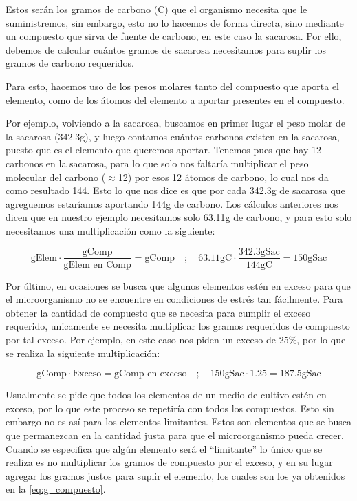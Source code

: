 Estos serán los gramos de carbono ($\text{C}$) que el organismo necesita que le suministremos, sin embargo, esto no lo hacemos de forma directa, sino mediante un compuesto que sirva de fuente de carbono, en este caso la sacarosa. Por ello, debemos de calcular cuántos gramos de sacarosa necesitamos para suplir los gramos de carbono requeridos.

Para esto, hacemos uso de los pesos molares tanto del compuesto que aporta el elemento, como de los átomos del elemento a aportar presentes en el compuesto.

Por ejemplo, volviendo a la sacarosa, buscamos en primer lugar el peso molar de la sacarosa (342.3g), y luego contamos cuántos carbonos existen en la sacarosa, puesto que es el elemento que queremos aportar. Tenemos pues que hay 12 carbonos en la sacarosa, para lo que solo nos faltaría multiplicar el peso molecular del carbono ($\approx$12) por esos 12 átomos de carbono, lo cual nos da como resultado 144. Esto lo que nos dice es que por cada 342.3g de sacarosa que agreguemos estaríamos aportando 144g de carbono. Los cálculos anteriores nos dicen que en nuestro ejemplo necesitamos solo 63.11g de carbono, y para esto solo necesitamos una multiplicación como la siguiente:  

\begin{equation}\label{eq:g_compuesto}
    \text{gElem} \cdot \frac{\text{gComp}}{\text{gElem en Comp}} = \text{gComp} \quad ; \quad 63.11\text{gC} \cdot \frac{342.3\text{gSac}}{144\text{gC}} = 150\text{gSac}
\end{equation}

Por último, en ocasiones se busca que algunos elementos estén en exceso para que el microorganismo no se encuentre en condiciones de estrés tan fácilmente. Para obtener la cantidad de compuesto que se necesita para cumplir el exceso requerido, unicamente se necesita multiplicar los gramos requeridos de compuesto por tal exceso. Por ejemplo, en este caso nos piden un exceso de 25\%, por lo que se realiza la siguiente multiplicación: 

\begin{equation}\label{eq:g_exceso}
    \text{gComp} \cdot \text{Exceso} = \text{gComp en exceso} \quad ; \quad 150\text{gSac} \cdot 1.25 = 187.5\text{gSac}
\end{equation}

Usualmente se pide que todos los elementos de un medio de cultivo estén en exceso, por lo que este proceso se repetiría con todos los compuestos. Esto sin embargo no es así para los elementos limitantes. Estos son elementos que se busca que permanezcan en la cantidad justa para que el microorganismo pueda crecer. Cuando se especifica que algún elemento será el ``limitante'' lo único que se realiza es no multiplicar los gramos de compuesto por el exceso, y en su lugar agregar los gramos justos para suplir el elemento, los cuales son los ya obtenidos en la \autoref{eq:g_compuesto}.

